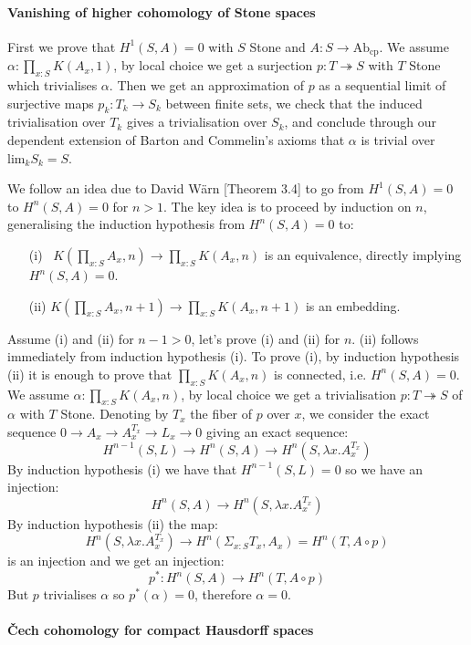 \documentclass[letterpaper]{../util/easychair}
\begin{document}
\paragraph*{Vanishing of higher cohomology of Stone spaces}

First we prove that $H^1(S,A) = 0$ with $S$ Stone and  $A : S\to \mathrm{Ab}_{\mathrm{cp}}$. We assume $\alpha:\prod_{x:S}K(A_x,1)$, by local choice we get a surjection $p:T\twoheadrightarrow S$ with $T$ Stone which trivialises $\alpha$. Then we get an approximation of $p$ as a sequential limit of surjective maps $p_k:T_k\to S_k$ between finite sets, we check that the induced trivialisation over $T_k$ gives a trivialisation over $S_k$, and conclude through our dependent extension of Barton and Commelin's axioms that $\alpha$ is trivial over $\mathrm{lim}_kS_k =S$.

We follow an idea due to David W\"arn \cite{cech-draft}[Theorem 3.4] to go from $H^1(S,A)=0$ to $H^n(S,A)=0$ for $n>1$. The key idea is to proceed by induction on $n$, generalising the induction hypothesis from $H^n(S,A) = 0$ to: 
\begin{itemize}
\item[(i)~] $ K(\prod_{x:S}A_x,n) \to \prod_{x:S}K(A_x,n)$ is an equivalence, directly implying $H^n(S,A)=0$.
\item[(ii)] $ K(\prod_{x:S}A_x,n+1) \to \prod_{x:S}K(A_x,n+1)$ is an embedding.
\end{itemize}
Assume (i) and (ii) for $n-1>0$, let's prove (i) and (ii) for $n$. (ii) follows immediately from induction hypothesis (i). To prove (i), by induction hypothesis (ii) it is enough to prove that $\prod_{x:S}K(A_x,n)$ is connected, i.e. $H^n(S,A)=0$. We assume $\alpha:\prod_{x:S}K(A_x,n)$, by local choice we get a trivialisation $p:T\twoheadrightarrow S$ of $\alpha$ with $T$ Stone. Denoting by $T_x$ the fiber of $p$ over $x$, we consider the exact sequence
$0\to A_x\to A_x^{T_x}\to L_x\to 0$ giving an exact sequence:
\[H^{n-1}(S,L)\to H^n(S,A)\to H^n(S,\lambda x. A_x^{T_x})\]
By induction hypothesis (i) we have that $H^{n-1}(S,L) = 0$ so we have an injection:
\[H^n(S,A)\to H^n(S,\lambda x. A_x^{T_x})\]
By induction hypothesis (ii) the map: 
\[H^n(S,\lambda x. A_x^{T_x}) \to H^n(\Sigma_{x:S}T_x,A_x) = H^n(T,A\circ p)\]
is an injection and we get an injection:
\[p^* : H^n(S,A)\to H^n(T,A\circ p)\] 
But $p$ trivialises $\alpha$ so $p^*(\alpha)=0$, therefore $\alpha=0$.

\paragraph*{\v{C}ech cohomology for compact Hausdorff spaces}
\end{document}
